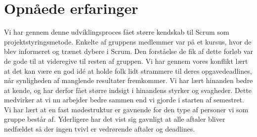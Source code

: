 \section{Opnåede erfaringer}

Vi har gennem denne udviklingsproces fået større kendskab til Scrum som projektstyringsmetode. Enkelte af gruppens medlemmer var på et kursus, hvor de blev informeret og trænet dybere i Scrum. Den forståelse de fik af dette forløb var de gode til at videregive til resten af gruppen. 
Vi har gennem vores konflikt lært at det kan være en god idé at holde folk lidt strammere til deres opgavedeadlines, når synligheden af manglende resultater fremkommer.  
Vi har lært hinanden bedre at kende, og har derfor fået større indsigt i hinandens styrker og svagheder. Dette medvirker at vi nu arbejder bedre sammen end vi gjorde i starten af semestret.
Vi har lært at en fast mødestruktur er gavnende for den type af personer vi som gruppe består af.
Yderligere har det vist sig gavnligt at alle aftaler bliver nedfældet så der ingen tvivl er vedrørende aftaler og deadlines.